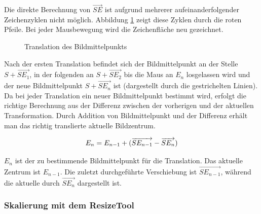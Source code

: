 Die direkte Berechnung von $\overrightarrow{SE}$ ist aufgrund mehrerer aufeinanderfolgender Zeichenzyklen nicht möglich. Abbildung \ref{movetool} zeigt diese Zyklen durch die roten Pfeile. Bei jeder Mausbewegung wird die Zeichenfläche neu gezeichnet. 

\begin{figure}[htbp]
  \vspace{0.5cm}
  \centering
   \caption{Translation des Bildmittelpunkts}
  \label{movetool}
  \vspace{0.5cm}
\end{figure}

Nach der ersten Translation befindet sich der Bildmittelpunkt an der Stelle $S + \overrightarrow{SE_1}$, in der folgenden an $S + \overrightarrow{SE_2}$ bis die Maus an $E_n$ losgelassen wird und der neue Bildmittelpunkt $S + \overrightarrow{SE_n}$ ist (dargestellt durch die gestrichelten Linien). Da bei jeder Translation ein neuer Bildmittelpunkt bestimmt wird, erfolgt die richtige Berechnung aus der Differenz zwischen der vorherigen und der aktuellen Transformation. Durch Addition von Bildmittelpunkt und der Differenz erhält man das richtig translierte aktuelle Bildzentrum.

\begin{equation}
E_n= E_{n-1} + (\overrightarrow{SE_{n-1}}-\overrightarrow{SE_n})
\vspace{0.5cm}
\end{equation}

$E_n$ ist der zu bestimmende Bildmittelpunkt für die Translation. Das aktuelle Zentrum ist $E_{n-1}$. Die zuletzt durchgeführte Verschiebung ist $\overrightarrow{SE_{n-1}}$, während die aktuelle durch $\overrightarrow{SE_n}$ dargestellt ist.

\subsubsection{Skalierung mit dem ResizeTool}

